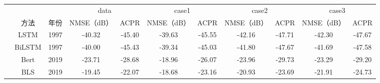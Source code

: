 
\begin{table}[]
\begin{tabular}{c|c|c|cc|cc|cc|cc}
\hline
\multicolumn{1}{l|}{}     &                      &                      & \multicolumn{2}{c|}{data}                                       & \multicolumn{2}{c|}{case1}                                      & \multicolumn{2}{c|}{case2}                                      & \multicolumn{2}{c}{case3}                                       \\ \cline{4-11} 
\multicolumn{1}{l|}{}     & \multirow{-2}{*}{方法} & \multirow{-2}{*}{年份} & NMSE（dB）                       & ACPR                           & NMSE（dB）                       & ACPR                           & NMSE（dB）                       & ACPR                           & NMSE（dB）                       & ACPR                           \\ \hline
                          & LSTM                 & 1997                 & -40.32                         & -45.40                         & \cellcolor[HTML]{FFC000}-39.63 & \cellcolor[HTML]{FFC000}-45.55 & \cellcolor[HTML]{FFFF00}-42.16 & \cellcolor[HTML]{FFFF00}-47.71 & \cellcolor[HTML]{FFC000}-42.30 & \cellcolor[HTML]{FFFF00}-47.67 \\
                          & BiLSTM               & 1997                 & -40.00                         & -45.43                         & \cellcolor[HTML]{FFFF00}-39.34 & -45.03                         & -41.80                         & -47.67                         & -41.69                         & -47.58                         \\
                          & Bert                 & 2019                 & -23.71                         & -28.68                         & -18.96                         & -26.07                         & -23.96                         & -29.73                         & -23.29                         & -29.20                         \\
                          & BLS                  & 2019                 & -19.45                         & -22.07                         & -18.68                         & -23.16                         & -20.93                         & -23.69                         & -21.91                         & -24.73                         \\

\end{tabular}
\end{table}
